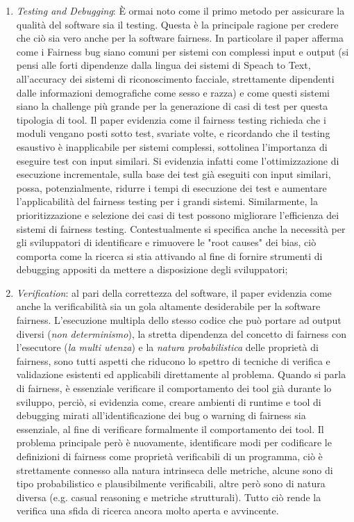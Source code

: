 \begin{enumerate}
    \item \emph{Testing and Debugging}: È ormai noto come il primo metodo per assicurare la qualità del software sia il testing. Questa è la principale ragione per credere che ciò sia vero anche per la software fairness. In particolare il paper afferma come i Fairness bug siano comuni per sistemi con complessi input e output (si pensi alle forti dipendenze dalla lingua dei sistemi di Speach to Text, all'accuracy dei sistemi di riconoscimento facciale, strettamente dipendenti dalle informazioni demografiche come sesso e razza) e come questi sistemi siano la challenge più grande per la generazione di casi di test per questa tipologia di tool. Il paper evidenzia come il fairness testing richieda che i moduli vengano posti sotto test, svariate volte, e ricordando che il testing esaustivo è inapplicabile per sistemi complessi, sottolinea l'importanza di eseguire test con input similari. Si evidenzia infatti come l'ottimizzazione di esecuzione incrementale, sulla base dei test già eseguiti con input similari, possa, potenzialmente, ridurre i tempi di esecuzione dei test e aumentare l'applicabilità del fairness testing per i grandi sistemi. Similarmente, la prioritizzazione e selezione dei casi di test possono migliorare l'efficienza dei sistemi di fairness testing. Contestualmente si specifica anche la necessità per gli sviluppatori di identificare e rimuovere le "root causes" dei bias, ciò comporta come la ricerca si stia attivando al fine di fornire strumenti di debugging appositi da mettere a disposizione degli sviluppatori;
    
    \item\emph{Verification}: al pari della correttezza del software, il paper evidenzia come anche la verificabilità sia un gola altamente desiderabile per la software fairness. L'esecuzione multipla dello stesso codice che può portare ad output diversi (\textit{non determinismo}), la stretta dipendenza del concetto di fairness con l'esecutore (\textit{la multi utenza}) e la \emph{natura probabilistica} delle proprietà di fairness, sono tutti aspetti che riducono lo spettro di tecniche di verifica e validazione esistenti ed applicabili direttamente al problema. Quando si parla di fairness, è essenziale verificare il comportamento dei tool già durante lo sviluppo, perciò, si evidenzia come, creare ambienti di runtime e tool di debugging mirati all'identificazione dei bug o warning di fairness sia essenziale, al fine di verificare formalmente il comportamento dei tool. Il problema principale però è nuovamente, identificare modi per codificare le definizioni di fairness come proprietà verificabili di un programma, ciò è strettamente connesso alla natura intrinseca delle metriche, alcune sono di tipo probabilistico e plausibilmente verificabili, altre però sono di natura diversa (e.g. casual reasoning e metriche strutturali). Tutto ciò rende la verifica una sfida di ricerca ancora molto aperta e avvincente.
\end{enumerate}

